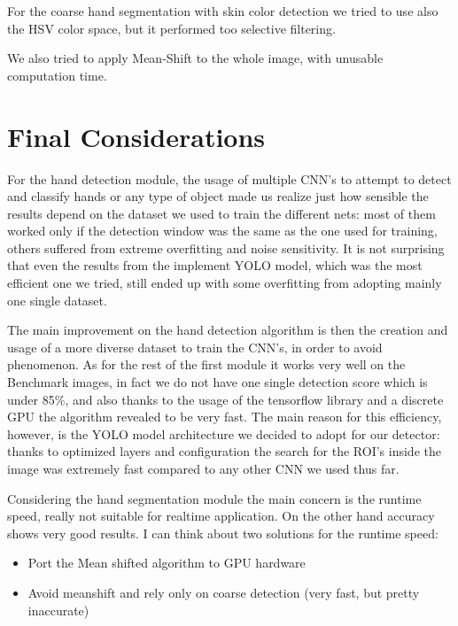 For the coarse hand segmentation with skin color detection we tried to use also the HSV color space, but it performed too selective filtering.

We also tried to apply Mean-Shift to the whole image, with unusable computation time.

\section{Final Considerations}
For the hand detection module, the usage of multiple CNN's to attempt to detect and classify hands or any type of object made us realize just 
how sensible the results depend on the dataset we used to train the different nets: most of them worked only if the detection window was the same 
as the one used for training, others suffered from extreme overfitting and noise sensitivity. It is not surprising that even 
the results from the implement YOLO model, which was the most efficient one we tried, still ended up with some overfitting from adopting
mainly one single dataset. 

The main improvement on the hand detection algorithm is then the creation and usage of a more diverse dataset to train the CNN's, in order to avoid phenomenon.
As for the rest of the first module it works very well on the Benchmark images, in fact we do not have one single detection score which is under 85\%, 
and also thanks to the usage of the tensorflow library and a discrete GPU the algorithm revealed to be very fast. The main reason for this efficiency, however,
is the YOLO model architecture we decided to adopt for our detector: thanks to optimized layers and configuration the search for the ROI's inside the image
was extremely fast compared to any other CNN we used thus far.

Considering the hand segmentation module the main concern is the runtime speed, really not suitable for realtime application. On the other hand accuracy shows 
very good results. I can think about two solutions for the runtime speed:
\begin{itemize}
    \item Port the Mean shifted algorithm to GPU hardware
    \item Avoid meanshift and rely only on coarse detection (very fast, but pretty inaccurate)
\end{itemize}

